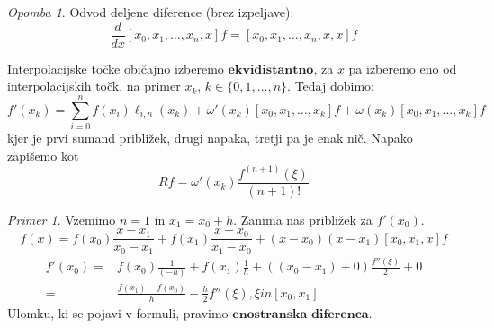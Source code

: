 \documentclass[a4paper,12pt]{article}
\theoremstyle{definition}
\theoremstyle{remark}
\newtheorem*{ex}{Primer}
\newtheorem*{rem}{Opomba}
\begin{document}
\begin{rem}
    Odvod deljene diference (brez izpeljave):
    \begin{equation*}
        \frac{d}{dx} [x_0, x_1, \dots, x_n, x] f = [x_0, x_1, \dots, x_n, x, x] f
    \end{equation*}
\end{rem}

Interpolacijske točke običajno izberemo $\textbf{ekvidistantno}$, za $x$ pa izberemo eno od interpolacijskih točk, na primer 
$x_k$, $k \in \{0, 1, \dots, n\}$. Tedaj dobimo:
\begin{equation*}
    f'(x_k) = \sum_{i=0}^{n}f(x_i) \ell_{i, n}(x_k) + \omega'(x_k) [x_0, x_1, \dots, x_k] f + \omega(x_k) [x_0, x_1, \dots, x_k] f
\end{equation*}
kjer je prvi sumand približek, drugi napaka, tretji pa je enak nič. Napako zapišemo kot
\begin{equation*}
    Rf = \omega'(x_k) \frac{f^{(n+1)}(\xi)}{(n+1)!}
\end{equation*}

\begin{ex}
    Vzemimo $n=1$ in $x_1 = x_0 + h$. Zanima nas približek za $f'(x_0)$.
    \begin{equation*}
        f(x) = f(x_0) \frac{x-x_1}{x_0-x_1} + f(x_1) \frac{x-x_0}{x_1-x_0} + (x-x_0)(x-x_1)[x_0, x_1, x]f
    \end{equation*}
    \begin{align*}
        f'(x_0) =& f(x_0) \frac{1}{(-h)} + f(x_1) \frac{1}{h} + ((x_0 - x_1)+0)\frac{f''(\xi)}{2} + 0 \\
                =& \frac{f(x_1)-f(x_0)}{h} - \frac{h}{2} f''(\xi), \xi in [x_0, x_1]
    \end{align*}
    Ulomku, ki se pojavi v formuli, pravimo $\textbf{enostranska diferenca}$.
\end{ex}
\end{document}
